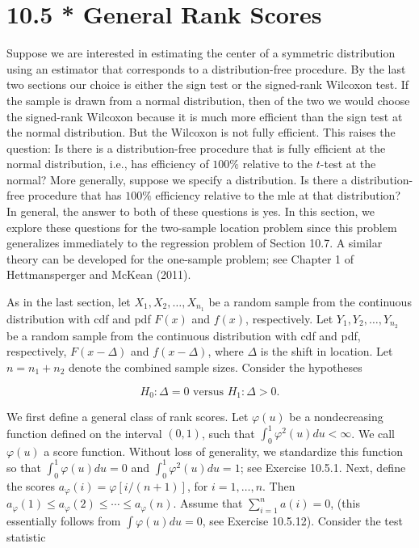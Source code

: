 \section*{10.5 * General Rank Scores}
Suppose we are interested in estimating the center of a symmetric distribution using an estimator that corresponds to a distribution-free procedure. By the last two sections our choice is either the sign test or the signed-rank Wilcoxon test. If the sample is drawn from a normal distribution, then of the two we would choose the signed-rank Wilcoxon because it is much more efficient than the sign test at the normal distribution. But the Wilcoxon is not fully efficient. This raises the question: Is there is a distribution-free procedure that is fully efficient at the normal distribution, i.e., has efficiency of $100 \%$ relative to the $t$-test at the normal? More generally, suppose we specify a distribution. Is there a distribution-free procedure that has $100 \%$ efficiency relative to the mle at that distribution? In general, the answer to both of these questions is yes. In this section, we explore these questions for the two-sample location problem since this problem generalizes immediately to the regression problem of Section 10.7. A similar theory can be developed for the one-sample problem; see Chapter 1 of Hettmansperger and McKean (2011).

As in the last section, let $X_{1}, X_{2}, \ldots, X_{n_{1}}$ be a random sample from the continuous distribution with cdf and pdf $F(x)$ and $f(x)$, respectively. Let $Y_{1}, Y_{2}, \ldots, Y_{n_{2}}$ be a random sample from the continuous distribution with cdf and pdf, respectively, $F(x-\Delta)$ and $f(x-\Delta)$, where $\Delta$ is the shift in location. Let $n=n_{1}+n_{2}$ denote the combined sample sizes. Consider the hypotheses


\begin{equation*}
H_{0}: \Delta=0 \text { versus } H_{1}: \Delta>0 . \tag{10.5.1}
\end{equation*}


We first define a general class of rank scores. Let $\varphi(u)$ be a nondecreasing function defined on the interval $(0,1)$, such that $\int_{0}^{1} \varphi^{2}(u) d u<\infty$. We call $\varphi(u)$ a score function. Without loss of generality, we standardize this function so that $\int_{0}^{1} \varphi(u) d u=0$ and $\int_{0}^{1} \varphi^{2}(u) d u=1$; see Exercise 10.5.1. Next, define the scores $a_{\varphi}(i)=\varphi[i /(n+1)]$, for $i=1, \ldots, n$. Then $a_{\varphi}(1) \leq a_{\varphi}(2) \leq \cdots \leq a_{\varphi}(n)$. Assume that $\sum_{i=1}^{n} a(i)=0$, (this essentially follows from $\int \varphi(u) d u=0$, see Exercise 10.5.12). Consider the test statistic


